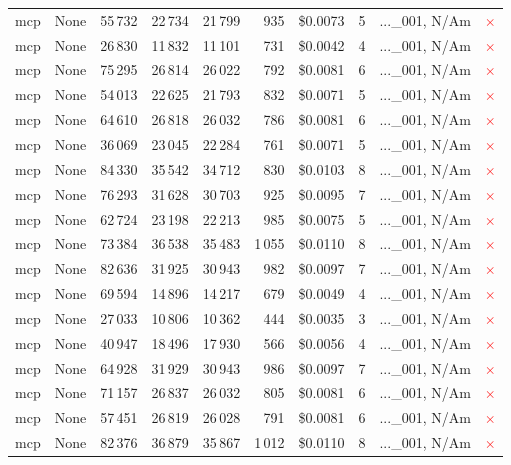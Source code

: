 \documentclass[a4paper,11pt]{article}
\begin{document}
\begin{table}[H]
{\begin{tabular}{l r r r r r r r l c}
mcp & None & 55\,732 & 22\,734 & 21\,799 & 935 & \$0.0073 & 5 & ...\_001, N/Am & \textcolor{red}{\(\times\)} \\
mcp & None & 26\,830 & 11\,832 & 11\,101 & 731 & \$0.0042 & 4 & ...\_001, N/Am & \textcolor{red}{\(\times\)} \\
mcp & None & 75\,295 & 26\,814 & 26\,022 & 792 & \$0.0081 & 6 & ...\_001, N/Am & \textcolor{red}{\(\times\)} \\
mcp & None & 54\,013 & 22\,625 & 21\,793 & 832 & \$0.0071 & 5 & ...\_001, N/Am & \textcolor{red}{\(\times\)} \\
mcp & None & 64\,610 & 26\,818 & 26\,032 & 786 & \$0.0081 & 6 & ...\_001, N/Am & \textcolor{red}{\(\times\)} \\
mcp & None & 36\,069 & 23\,045 & 22\,284 & 761 & \$0.0071 & 5 & ...\_001, N/Am & \textcolor{red}{\(\times\)} \\
mcp & None & 84\,330 & 35\,542 & 34\,712 & 830 & \$0.0103 & 8 & ...\_001, N/Am & \textcolor{red}{\(\times\)} \\
mcp & None & 76\,293 & 31\,628 & 30\,703 & 925 & \$0.0095 & 7 & ...\_001, N/Am & \textcolor{red}{\(\times\)} \\
mcp & None & 62\,724 & 23\,198 & 22\,213 & 985 & \$0.0075 & 5 & ...\_001, N/Am & \textcolor{red}{\(\times\)} \\
mcp & None & 73\,384 & 36\,538 & 35\,483 & 1\,055 & \$0.0110 & 8 & ...\_001, N/Am & \textcolor{red}{\(\times\)} \\
mcp & None & 82\,636 & 31\,925 & 30\,943 & 982 & \$0.0097 & 7 & ...\_001, N/Am & \textcolor{red}{\(\times\)} \\
mcp & None & 69\,594 & 14\,896 & 14\,217 & 679 & \$0.0049 & 4 & ...\_001, N/Am & \textcolor{red}{\(\times\)} \\
mcp & None & 27\,033 & 10\,806 & 10\,362 & 444 & \$0.0035 & 3 & ...\_001, N/Am & \textcolor{red}{\(\times\)} \\
mcp & None & 40\,947 & 18\,496 & 17\,930 & 566 & \$0.0056 & 4 & ...\_001, N/Am & \textcolor{red}{\(\times\)} \\
mcp & None & 64\,928 & 31\,929 & 30\,943 & 986 & \$0.0097 & 7 & ...\_001, N/Am & \textcolor{red}{\(\times\)} \\
mcp & None & 71\,157 & 26\,837 & 26\,032 & 805 & \$0.0081 & 6 & ...\_001, N/Am & \textcolor{red}{\(\times\)} \\
mcp & None & 57\,451 & 26\,819 & 26\,028 & 791 & \$0.0081 & 6 & ...\_001, N/Am & \textcolor{red}{\(\times\)} \\
mcp & None & 82\,376 & 36\,879 & 35\,867 & 1\,012 & \$0.0110 & 8 & ...\_001, N/Am & \textcolor{red}{\(\times\)} \\

\end{tabular}}
\end{table}
\end{document}
